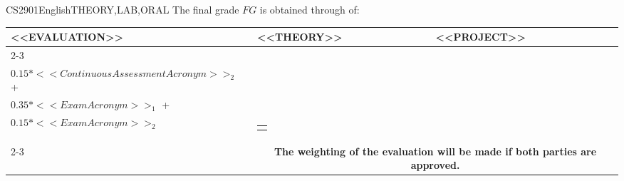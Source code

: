   \begin{evaluation}{CS2901}{English}{THEORY,LAB,ORAL}
  The final grade $FG$ is obtained through of:
 
  \begin{tabularx}{0.9\textwidth}{|X|p{}|p{}|} \hline
    \multirow{4}{*}{\uppercase{<<Evaluation>>}} & \uppercase{<<Theory>>} & \uppercase{<<Project>>} \\ \cline{2-3}
    & %
        \begin{minipage}{0.95\textwidth}
        \begin{tabular}{l}
          $0.15*<<ContinuousAssessmentAcronym>>_{1}$ + \\
          $0.15*<<ContinuousAssessmentAcronym>>_{2}$ + \\
          $0.35*<<ExamAcronym>>_{1}$ + \\
          $0.15*<<ExamAcronym>>_{2}$
        \end{tabular} 
        \end{minipage} 
    & %
        \begin{minipage}{0.95\textwidth}
        \begin{tabular}{l}
            $0.2(A + D) + 0.3(Dev) + 0.3(DF)$
            \end{tabular} 
        \end{minipage}                 \\ \cline{2-3}
    
    & \multicolumn{2}{c|}{\textbf{The weighting of the evaluation will be made if both parties are approved.}}  \\ \hline
    \end{tabularx}
    

\end{evaluation}
